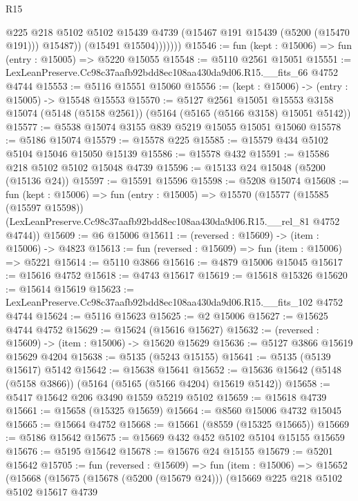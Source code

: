 \begin{lexlean}{R15}
\begin{coremodule}
{{{{{{{{{{{                    @225
                    @218
                    @5102
                    @5102
                    @15439
                    @4739
                    (@15467 @191 @15439 (@5200 (@15470 @191)))
                    @15487))
                (@15491 @15504)))))))
@15546 := fun (kept : @15006) => fun (entry : @15005) => @5220 @15055
@15548 := @5110 @2561 @15051
@15551 := LexLeanPreserve.Cc98c37aafb92bdd8ec108aa430da9d06.R15.__fits_66 @4752 @4744
@15553 := @5116 @15551 @15060
@15556 := (kept : @15006) -> (entry : @15005) -> @15548 @15553
@15570 := @5127
    @2561
    @15051
    @15553
    @3158
    @15074
    (@5148 (@5158 @2561))
    (@5164 (@5165 (@5166 @3158) @15051 @5142))
@15577 := @5538 @15074 @3155 @839 @5219 @15055 @15051 @15060
@15578 := @5186 @15074
@15579 := @15578 @225
@15585 := @15579 @434 @5102 @5104 @15046 @15050 @15139
@15586 := @15578 @432
@15591 := @15586 @218 @5102 @5102 @15048 @4739
@15596 := @15133 @24 @15048 (@5200 (@15136 @24))
@15597 := @15591 @15596
@15598 := @5208 @15074
@15608 := fun (kept : @15006) =>
  fun (entry : @15005) =>
  @15570
    (@15577
      (@15585 (@15597 @15598))
      (LexLeanPreserve.Cc98c37aafb92bdd8ec108aa430da9d06.R15.__rel_81 @4752 @4744))
@15609 := @6 @15006
@15611 := (reversed : @15609) -> (item : @15006) -> @4823
@15613 := fun (reversed : @15609) => fun (item : @15006) => @5221
@15614 := @5110 @3866
@15616 := @4879 @15006 @15045
@15617 := @15616 @4752
@15618 := @4743 @15617
@15619 := @15618 @15326
@15620 := @15614 @15619
@15623 := LexLeanPreserve.Cc98c37aafb92bdd8ec108aa430da9d06.R15.__fits_102 @4752 @4744
@15624 := @5116 @15623
@15625 := @2 @15006
@15627 := @15625 @4744 @4752
@15629 := @15624 (@15616 @15627)
@15632 := (reversed : @15609) -> (item : @15006) -> @15620 @15629
@15636 := @5127 @3866 @15619 @15629 @4204
@15638 := @5135 (@5243 @15155)
@15641 := @5135 (@5139 @15617) @5142
@15642 := @15638 @15641
@15652 := @15636 @15642 (@5148 (@5158 @3866)) (@5164 (@5165 (@5166 @4204) @15619 @5142))
@15658 := @5417 @15642 @206 @3490 @1559 @5219 @5102
@15659 := @15618 @4739
@15661 := @15658 (@15325 @15659)
@15664 := @8560 @15006 @4732 @15045
@15665 := @15664 @4752
@15668 := @15661 (@8559 (@15325 @15665))
@15669 := @5186 @15642
@15675 := @15669 @432 @452 @5102 @5104 @15155 @15659
@15676 := @5195 @15642
@15678 := @15676 @24 @15155
@15679 := @5201 @15642
@15705 := fun (reversed : @15609) =>
  fun (item : @15006) =>
  @15652
    (@15668
      (@15675
        (@15678 (@5200 (@15679 @24)))
        (@15669
          @225
          @218
          @5102
          @5102
          @15617
          @4739
}}}}}}}}}}}
\end{coremodule}
\end{lexlean}
